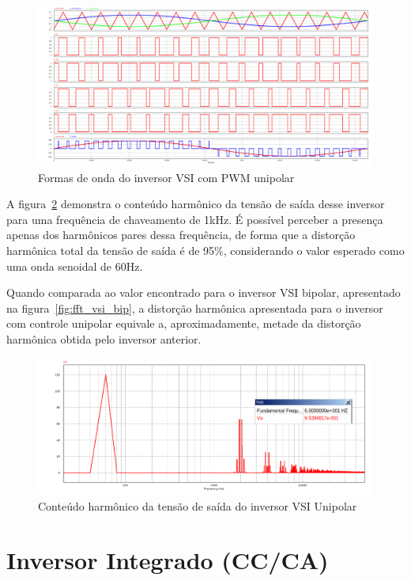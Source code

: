 \documentclass[
	12pt,				%
	openany,
	onseside,
	a4paper,			%
	english,			%
	french,				%
	spanish,			%
	brazil,				%
	]{abntex2}
\begin{document}
\begin{figure}[htbp]%
	\centering%
		\includegraphics[width= \linewidth]{vsi_uni_func}
		\caption{Formas de onda do inversor VSI com PWM unipolar}
		\label{fig:vsi_uni_func_graph}
\end{figure}

A figura~\ref{fig:fft_vsi_unip} demonstra o conteúdo harmônico da tensão de saída desse inversor para uma frequência de chaveamento de 1kHz. É possível perceber a presença apenas dos harmônicos pares dessa frequência, de forma que a distorção harmônica total da tensão de saída é de 95\%, considerando o valor esperado como uma onda senoidal de 60Hz. 

Quando comparada ao valor encontrado para o inversor VSI bipolar, apresentado na figura~\ref{fig:fft_vsi_bip}, a distorção harmônica apresentada para o inversor com controle unipolar equivale a, aproximadamente, metade da distorção harmônica obtida pelo inversor anterior. 

\begin{figure}[H]%
	\centering%
		\includegraphics[width= \linewidth]{fft_vsi_uni}
		\caption{Conteúdo harmônico da tensão de saída do inversor VSI Unipolar}
		\label{fig:fft_vsi_unip}
\end{figure}

\section{Inversor Integrado (CC/CA)}
\end{document}
